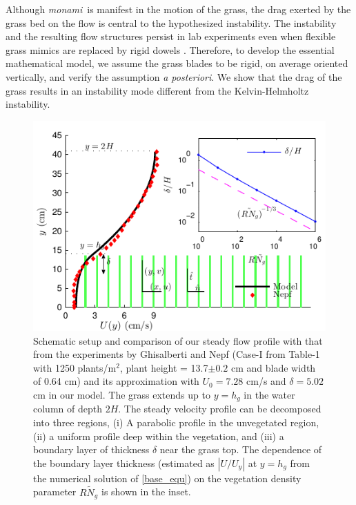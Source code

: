 \documentclass[aps,prl,twocolumn,superscriptaddress,sort&compress,10pt]{revtex4-1}  %
\newcommand{\hg}{h_g}
\newcommand{\Rey}{{R}}
\newcommand{\Ndg}{\tilde{N}_g}
\newcommand{\monami}{\textit{monami}}
\begin{document}
Although \monami ~is manifest in the motion of the grass, the drag exerted by the grass bed on the flow is central to the hypothesized instability. 
The instability and the resulting flow structures persist in lab experiments even when flexible grass mimics are replaced by rigid dowels \cite{Ghisal02,Nepf06}. 
Therefore, to develop the essential mathematical model, we assume the grass blades to be rigid, on average oriented vertically, and verify the assumption \textit{a posteriori}.
We show that the drag of the grass results in an instability mode different from the Kelvin-Helmholtz instability.
\begin{figure}
\includegraphics[scale=1]{Grass_Base_Nepf_shear}
\caption{Schematic setup and comparison of our steady flow profile with that from the experiments by Ghisalberti and Nepf \cite{Nepf04} (Case-I from Table-1 with 1250 plants/m$^2$, 
plant height = 13.7$\pm 0.2$ cm and blade width of 0.64 cm)
 and its approximation with $U_0=7.28$ cm/s and $\delta = 5.02$ cm in our model. The grass extends up to $y=h_g$ in the water column of depth $2H$. 
The steady velocity profile can be decomposed into three regions, (i) A parabolic profile in the unvegetated region, (ii) a uniform profile deep within the vegetation, and (iii) a boundary layer of thickness $\delta$ near the grass top. 
The dependence of the boundary layer thickness (estimated as $|U/U_y|$ at $y=\hg$ from the numerical solution of \eqref{base_equ}) on the vegetation density parameter $\Rey \Ndg$ is shown in the inset.}
\label{basicflow}
\end{figure}
\end{document}
